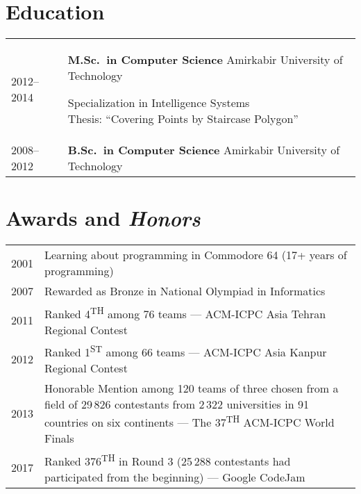 \documentclass[a4paper,10pt]{article}
\newcommand{\graynote}[1]{\hfill{\footnotesize\color{lightgray}#1}}
\newcommand{\follownote}[1]{--- {\footnotesize\color{darkblue}#1}}
\begin{document}
\section*{{\color{red}E}ducation}

\setlength{\extrarowheight}{9pt}
\begin{tabular}{ll}
2012--2014 & \parbox[t]{11cm}{
	\textbf{M.Sc.\ in Computer Science}
	\graynote{Amirkabir University of Technology}

	Specialization in Intelligence Systems \\[1pt]
	Thesis: ``Covering Points by Staircase Polygon''
} \\

2008--2012 & \parbox[t]{11cm}{
	\textbf{B.Sc.\ in Computer Science}
	\graynote{Amirkabir University of Technology}
} \\
\end{tabular}

\section*{{\color{orange}A}wards and \emph{Honors}}

\begin{tabular}{ll}
2001 & \parbox[t]{11cm}{
	Learning about programming in Commodore 64
	    (17+ years of programming)
} \\

2007 & \parbox[t]{11cm}{
	Rewarded as Bronze in National Olympiad in Informatics
} \\

2011 & \parbox[t]{11cm}{
	Ranked 4\textsuperscript{TH} among 76 teams 
	    \follownote{ACM-ICPC Asia Tehran Regional Contest}
} \\

2012 & \parbox[t]{11cm}{
	Ranked 1\textsuperscript{ST} among 66 teams
	    \follownote{ACM-ICPC Asia Kanpur Regional Contest}
} \\

2013 & \parbox[t]{11cm}{
	Honorable Mention among 120 teams of three chosen from a
	    field of 29\,826 contestants from 2\,322 universities in 91
	    countries on six continents
	    \follownote{The 37\textsuperscript{TH} ACM-ICPC World Finals}
} \\

2017 & \parbox[t]{11cm}{
	Ranked 376\textsuperscript{TH} in Round 3 (25\,288 contestants
	    had participated from the beginning)
	    \follownote{Google CodeJam}
} \\
\end{tabular}
\end{document}
